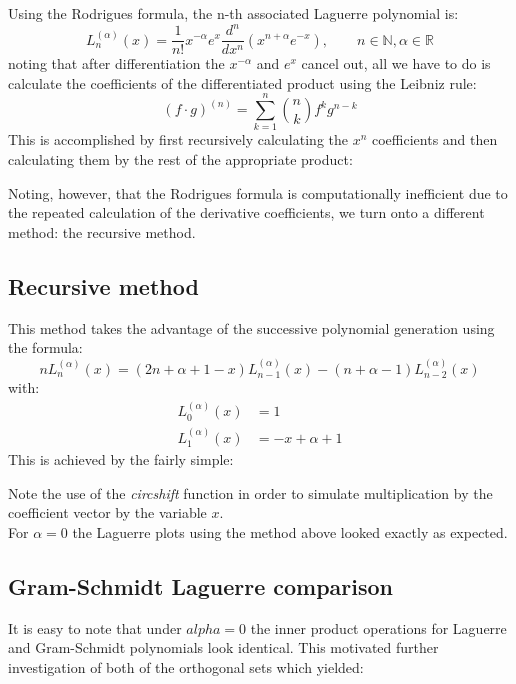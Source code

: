 \documentclass[a4paper]{article}
\numberwithin{equation}{section}
\begin{document}
Using the Rodrigues formula, the n-th associated Laguerre polynomial is:
\begin{equation}
L_n^{(\alpha)}(x)=\frac{1}{n!}x^{-\alpha}e^x\frac{d^n}{dx^n}(x^{n+\alpha}e^{-x}), \quad\quad n \in \mathbb{N}, \alpha \in \mathbb{R}
\end{equation}
noting that after differentiation the $x^{-\alpha}$ and ${e^x}$ cancel out, all we have to do is calculate the coefficients of the differentiated product using the Leibniz rule:
\begin{equation}
(f \cdot g)^{(n)} = \sum_{k=1}^{n} \binom{n}{k} f^k g^{n-k}
\end{equation}
This is accomplished by first recursively calculating the $x^n$ coefficients and then calculating them by the rest of the appropriate product:



Noting, however, that the Rodrigues formula is computationally inefficient due to the repeated calculation of the derivative coefficients, we turn onto a different method: the recursive method.

\subsection{Recursive method}

This method takes the advantage of the successive polynomial generation using the formula:
\begin{equation}
n L_n^{(\alpha)}(x) = (2n + \alpha + 1 - x) L_{n-1}^{(\alpha)}(x) - (n + \alpha - 1) L_{n-2}^{(\alpha)}(x)
\end{equation}
with:
\begin{align}
L_0^{(\alpha)}(x) &= 1 \\
L_1^{(\alpha)}(x) &= -x+\alpha+1
\end{align}
This is achieved by the fairly simple:


\noindent Note the use of the \textit{circshift} function in order to simulate multiplication by the coefficient vector by the variable $x$.\\
For $\alpha = 0$ the Laguerre plots using the method above looked exactly as expected.

\subsection{Gram-Schmidt Laguerre comparison}

It is easy to note that under $alpha = 0$ the inner product operations for Laguerre and Gram-Schmidt polynomials look identical. This motivated further investigation of both of the orthogonal sets which yielded:
\end{document}
